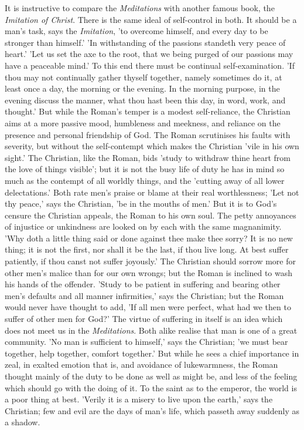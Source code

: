 It is instructive to compare the \emph{Meditations} with another famous book, the
\emph{Imitation of Christ}. There is the same ideal of self-control in both. It should
be a man's task, says the \emph{Imitation}, 'to overcome himself, and every day to be
stronger than himself.' 'In withstanding of the passions standeth very peace of
heart.' 'Let us set the axe to the root, that we being purged of our passions
may have a peaceable mind.' To this end there must be continual
self-examination. 'If thou may not continually gather thyself together, namely
sometimes do it, at least once a day, the morning or the evening. In the
morning purpose, in the evening discuss the manner, what thou hast been this
day, in word, work, and thought.' But while the Roman's temper is a modest
self-reliance, the Christian aims at a more passive mood, humbleness and
meekness, and reliance on the presence and personal friendship of God. The
Roman scrutinises his faults with severity, but without the self-contempt which
makes the Christian 'vile in his own sight.' The Christian, like the Roman,
bids 'study to withdraw thine heart from the love of things visible'; but it is
not the busy life of duty he has in mind so much as the contempt of all worldly
things, and the 'cutting away of all lower delectations.' Both rate men's
praise or blame at their real worthlessness; 'Let not thy peace,' says the
Christian, 'be in the mouths of men.' But it is to God's censure the Christian
appeals, the Roman to his own soul. The petty annoyances of injustice or
unkindness are looked on by each with the same magnanimity. 'Why doth a little
thing said or done against thee make thee sorry? It is no new thing; it is not
the first, nor shall it be the last, if thou live long. At best suffer
patiently, if thou canst not suffer joyously.' The Christian should sorrow more
for other men's malice than for our own wrongs; but the Roman is inclined to
wash his hands of the offender. 'Study to be patient in suffering and bearing
other men's defaults and all manner infirmities,' says the Christian; but the
Roman would never have thought to add, 'If all men were perfect, what had we
then to suffer of other men for God?' The virtue of suffering in itself is an
idea which does not meet us in the \emph{Meditations}. Both alike realise that man is
one of a great community. 'No man is sufficient to himself,' says the
Christian; 'we must bear together, help together, comfort together.' But while
he sees a chief importance in zeal, in exalted emotion that is, and avoidance
of lukewarmness, the Roman thought mainly of the duty to be done as well as
might be, and less of the feeling which should go with the doing of it. To the
saint as to the emperor, the world is a poor thing at best. 'Verily it is a
misery to live upon the earth,' says the Christian; few and evil are the days
of man's life, which passeth away suddenly as a shadow.

